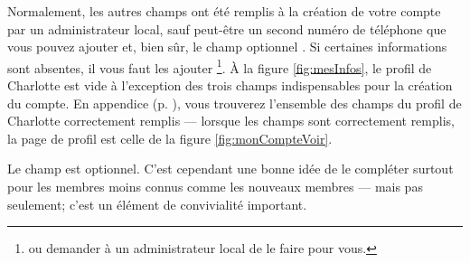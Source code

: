 Normalement, les autres champs ont été remplis à la création de votre compte par un administrateur local, sauf peut-être un second numéro de téléphone que vous pouvez ajouter et, bien sûr, le champ optionnel . Si certaines informations sont absentes, il vous faut les ajouter
\footnote{ou demander à un administrateur local de le faire pour vous.}. 
À la figure \ref{fig:mesInfos}, le profil de Charlotte est vide à l'exception des trois champs indispensables pour la création du compte. En appendice (p. \pageref{fig:profilCharlotteComplet}), vous trouverez l'ensemble des champs du profil de Charlotte correctement remplis --- lorsque les champs sont correctement remplis, la page de profil est celle de la figure \vref{fig:monCompteVoir}.

Le champ  est optionnel. C'est cependant une bonne idée de le compléter surtout pour les membres moins connus comme les nouveaux membres --- mais pas seulement; c'est un élément de convivialité important.

